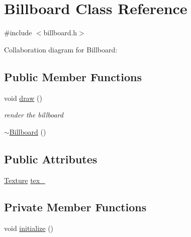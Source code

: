 \hypertarget{classBillboard}{}\section{Billboard Class Reference}
\label{classBillboard}


{\ttfamily \#include $<$billboard.\+h$>$}



Collaboration diagram for Billboard\+:
\subsection*{Public Member Functions}
\begin{DoxyCompactItemize}
\item 
void \hyperlink{classBillboard_a73af60c0e061ef88553d28d29ca33f07}{draw} ()
\begin{DoxyCompactList}\small\item\em render the billboard \end{DoxyCompactList}\item 
\hyperlink{classBillboard_a0a1c7c220f3622c635fda7ded5f1fdcb}{$\sim$\+Billboard} ()
\end{DoxyCompactItemize}
\subsection*{Public Attributes}
\begin{DoxyCompactItemize}
\item 
\hyperlink{classTexture}{Texture} \hyperlink{classBillboard_a206d9f248ea6491e63aa19486b65b944}{tex\+\_\+}
\end{DoxyCompactItemize}
\subsection*{Private Member Functions}
\begin{DoxyCompactItemize}
\item 
void \hyperlink{classBillboard_af03f5053e9142e48b6206aee42ff4b11}{initialize} ()
\end{DoxyCompactItemize}

